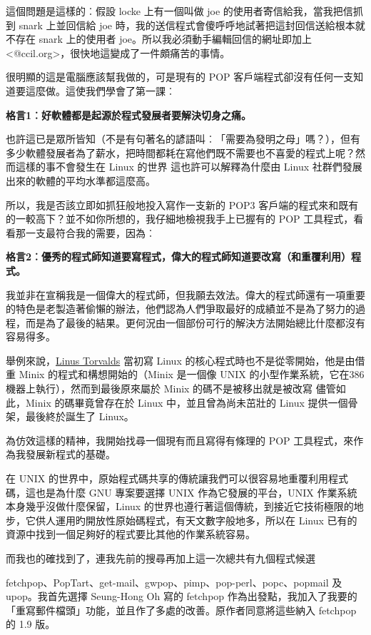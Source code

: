 \documentclass[12pt,]{article}
\makeatletter
\newcommand*{\shifttext}[2]{%
  \settowidth{\@tempdima}{#2}%
  \makebox[\@tempdima]{\hspace*{#1}#2}%
}
\makeatother
\begin{document}
這個問題是這樣的︰假設 locke 上有一個叫做 joe
的使用者寄信給我，當我把信抓到 snark 上並回信給 joe
時，我的送信程式會傻呼呼地試著把這封回信送給根本就不存在 snark 上的使用者
joe。所以我必須動手編輯回信的網址即加上
\textless{}@ccil.org\textgreater{}，很快地這變成了一件頗痛苦的事情。

很明顯的這是電腦應該幫我做的，可是現有的 POP
客戶端程式卻沒有任何一支知道要這麼做。這使我們學會了第一課︰

\textbf{格言1︰好軟體都是起源於程式發展者要解決切身之痛。}

也許這已是眾所皆知（不是有句著名的諺語叫︰「需要為發明之母」嗎？），但有多少軟體發展者為了薪水，把時間都耗在寫他們既不需要也不喜愛的程式上呢？然而這樣的事不會發生在
Linux 的世界 \shifttext{1pt}{---}\shifttext{-1pt}{---} 這也許可以解釋為什麼由 Linux
社群們發展出來的軟體的平均水準都這麼高。

所以，我是否該立即如抓狂般地投入寫作一支新的 POP3
客戶端的程式來和既有的一較高下？並不如你所想的，我仔細地檢視我手上已握有的
POP 工具程式，看看那一支最符合我的需要，因為︰

\textbf{格言2︰優秀的程式師知道要寫程式，偉大的程式師知道要改寫（和重覆利用）程式。}

我並非在宣稱我是一個偉大的程式師，但我願去效法。偉大的程式師還有一項重要的特色是老製造著偷懶的辦法，他們認為人們爭取最好的成績並不是為了努力的過程，而是為了最後的結果。更何況由一個部份可行的解決方法開始總比什麼都沒有容易得多。

舉例來說，\href{http://www.tuxedo.org/~esr/faqs/linus}{Linus Torvalds}
當初寫 Linux 的核心程式時也不是從零開始，他是由借重 Minix
的程式和構想開始的（Minix 是一個像 UNIX
的小型作業系統，它在386機器上執行），然而到最後原來屬於 Minix
的碼不是被移出就是被改寫 \shifttext{1pt}{---}\shifttext{-1pt}{---} 儘管如此，Minix 的碼畢竟曾存在於 Linux
中，並且曾為尚未茁壯的 Linux 提供一個骨架，最後終於誕生了 Linux。

為仿效這樣的精神，我開始找尋一個現有而且寫得有條理的 POP
工具程式，來作為我發展新程式的基礎。

在 UNIX
的世界中，原始程式碼共享的傳統讓我們可以很容易地重覆利用程式碼，這也是為什麼
GNU 專案要選擇 UNIX 作為它發展的平台，UNIX
作業系統本身幾乎沒做什麼保留，Linux
的世界也遵行著這個傳統，到接近它技術極限的地步，它供人運用旳開放性原始碼程式，有天文數字般地多，所以在
Linux 已有的資源中找到一個足夠好的程式要比其他的作業系統容易。

而我也的確找到了，連我先前的搜尋再加上這一次總共有九個程式候選 \shifttext{1pt}{---}\shifttext{-1pt}{---}
fetchpop、PopTart、get-mail、gwpop、pimp、pop-perl、popc、popmail 及
upop。我首先選擇 Seung-Hong Oh 寫的 fetchpop
作為出發點，我加入了我要的「重寫郵件檔頭」功能，並且作了多處的改善。原作者同意將這些納入
fetchpop 的 1.9 版。
\end{document}
